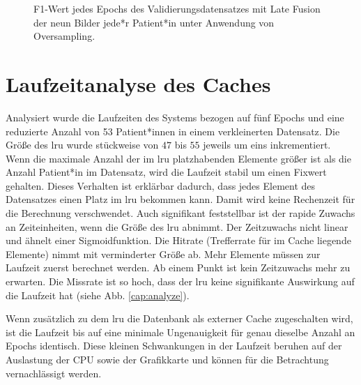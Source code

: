 \begin{figure}[b]\centering
\makebox[0pt]{}
\caption[F1-Wert jedes Epochs des Validierungsdatensatzes mit Late Fusion unter Anwendung von Oversampling]{F1-Wert jedes Epochs des Validierungsdatensatzes mit Late Fusion der neun Bilder jede*r Patient*in unter Anwendung von Oversampling.}\label{cap:f1_lf_oversampling}
\end{figure}\label{fig:f1_lf_oversampling}






















\clearpage
\section{Laufzeitanalyse des Caches}\label{analyze}
Analysiert wurde die Laufzeiten des Systems bezogen auf fünf Epochs und eine reduzierte Anzahl von 53 Patient*innen in einem verkleinerten Datensatz. Die Größe des \ac{lru} wurde stückweise von $47$ bis $55$ jeweils um eins inkrementiert. Wenn die maximale Anzahl der im \ac{lru} platzhabenden Elemente größer ist als die Anzahl Patient*in im Datensatz, wird die Laufzeit stabil um einen Fixwert gehalten. Dieses Verhalten ist erklärbar dadurch, dass jedes Element des Datensatzes einen Platz im \ac{lru} bekommen kann. Damit wird keine Rechenzeit für die Berechnung verschwendet. Auch signifikant feststellbar ist der rapide Zuwachs an Zeiteinheiten, wenn die Größe des \ac{lru} abnimmt. Der Zeitzuwachs nicht linear und ähnelt einer Sigmoidfunktion. Die Hitrate (Trefferrate für im Cache liegende Elemente) nimmt mit verminderter Größe ab. Mehr Elemente müssen zur Laufzeit zuerst berechnet werden. Ab einem Punkt ist kein Zeitzuwachs mehr zu erwarten. Die Missrate ist so hoch, dass der \ac{lru} keine signifikante Auswirkung auf die Laufzeit hat (siehe Abb. \ref{cap:analyze}).

Wenn zusätzlich zu dem \ac{lru} die Datenbank als externer Cache zugeschalten wird, ist die Laufzeit bis auf eine minimale Ungenauigkeit für genau dieselbe Anzahl an Epochs identisch. Diese kleinen Schwankungen in der Laufzeit beruhen auf der Auslastung der CPU sowie der Grafikkarte und können für die Betrachtung vernachlässigt werden.

